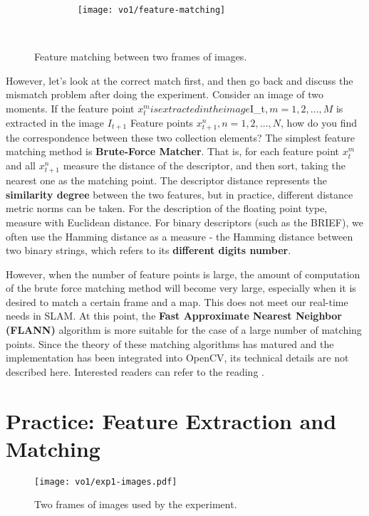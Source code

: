 \begin{figure}[!htp]
    \centering
    \texttt{[image: vo1/feature-matching]}
    \caption{Feature matching between two frames of images. }
    \label{fig:feature-matching}
\end{figure}

However, let's look at the correct match first, and then go back and discuss the mismatch problem after doing the experiment. Consider an image of two moments. If the feature point $x_{t}^{m} is extracted in the image $I_{t}$, m=1, 2, ..., M$ is extracted in the image $I_{t+1}$ Feature points $x_{t+1}^{n}, n=1,2,...,N$, how do you find the correspondence between these two collection elements? The simplest feature matching method is \textbf{Brute-Force Matcher}. That is, for each feature point $x_{t}^{m}$ and all $x_{t+1}^{n}$ measure the distance of the descriptor, and then sort, taking the nearest one as the matching point. The descriptor distance represents the \textbf{similarity degree} between the two features, but in practice, different distance metric norms can be taken. For the description of the floating point type, measure with Euclidean distance. For binary descriptors (such as the BRIEF), we often use the Hamming distance as a measure - the Hamming distance between two binary strings, which refers to its \textbf{different digits number}.

However, when the number of feature points is large, the amount of computation of the brute force matching method will become very large, especially when it is desired to match a certain frame and a map. This does not meet our real-time needs in SLAM. At this point, the \textbf{Fast Approximate Nearest Neighbor (FLANN)} algorithm is more suitable for the case of a large number of matching points. Since the theory of these matching algorithms has matured and the implementation has been integrated into OpenCV, its technical details are not described here. Interested readers can refer to the reading \cite{Muja2009}.

\section{Practice: Feature Extraction and Matching}
\begin{figure}[!htp]
\centering
\texttt{[image: vo1/exp1-images.pdf]}
\caption{Two frames of images used by the experiment. }
\label{fig:exp1-images}
\end{figure}

